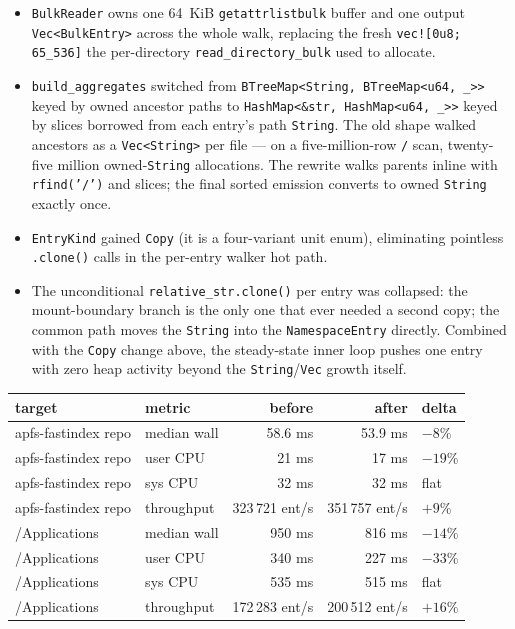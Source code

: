 \begin{itemize}
  \item \texttt{BulkReader} owns one 64~KiB
    \texttt{getattrlistbulk} buffer and one output
    \texttt{Vec<BulkEntry>} across the whole walk, replacing the
    fresh \texttt{vec![0u8; 65\_536]} the per-directory
    \texttt{read\_directory\_bulk} used to allocate.
  \item \texttt{build\_aggregates} switched from
    \texttt{BTreeMap<String, BTreeMap<u64, \_{}>>} keyed by owned
    ancestor paths to \texttt{HashMap<\&str, HashMap<u64, \_{}>>}
    keyed by slices borrowed from each entry's path
    \texttt{String}. The old shape walked ancestors as a
    \texttt{Vec<String>} per file --- on a five-million-row
    \texttt{/} scan, twenty-five million owned-\texttt{String}
    allocations. The rewrite walks parents inline with
    \texttt{rfind('/')} and slices; the final sorted emission
    converts to owned \texttt{String} exactly once.
  \item \texttt{EntryKind} gained \texttt{Copy} (it is a
    four-variant unit enum), eliminating pointless
    \texttt{.clone()} calls in the per-entry walker hot path.
  \item The unconditional \texttt{relative\_str.clone()} per
    entry was collapsed: the mount-boundary branch is the only
    one that ever needed a second copy; the common path moves
    the \texttt{String} into the \texttt{NamespaceEntry}
    directly. Combined with the \texttt{Copy} change above, the
    steady-state inner loop pushes one entry with zero heap
    activity beyond the \texttt{String}/\texttt{Vec} growth
    itself.
\end{itemize}

\begin{center}
\begin{tabular}{llrrl}
\toprule
target & metric & before & after & delta \\
\midrule
apfs-fastindex repo & median wall    & 58.6 ms       & 53.9 ms       & $-8\%$ \\
apfs-fastindex repo & user CPU       & 21 ms         & 17 ms         & $-19\%$ \\
apfs-fastindex repo & sys CPU        & 32 ms         & 32 ms         & flat \\
apfs-fastindex repo & throughput     & 323\,721 ent/s & 351\,757 ent/s & $+9\%$ \\
/Applications       & median wall    & 950 ms        & 816 ms        & $-14\%$ \\
/Applications       & user CPU       & 340 ms        & 227 ms        & $-33\%$ \\
/Applications       & sys CPU        & 535 ms        & 515 ms        & flat \\
/Applications       & throughput     & 172\,283 ent/s & 200\,512 ent/s & $+16\%$ \\
\bottomrule
\end{tabular}
\end{center}

